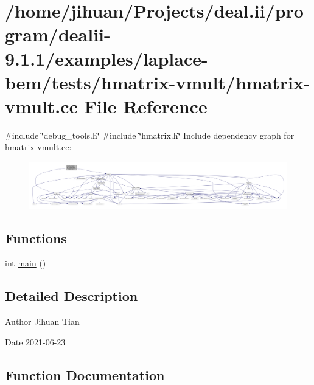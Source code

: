 \hypertarget{hmatrix-vmult_8cc}{}\section{/home/jihuan/\+Projects/deal.ii/program/dealii-\/9.1.1/examples/laplace-\/bem/tests/hmatrix-\/vmult/hmatrix-\/vmult.cc File Reference}
\label{hmatrix-vmult_8cc}
{\ttfamily \#include \char`\"{}debug\+\_\+tools.\+h\char`\"{}}\newline
{\ttfamily \#include \char`\"{}hmatrix.\+h\char`\"{}}\newline
Include dependency graph for hmatrix-\/vmult.cc\+:
\nopagebreak
\begin{figure}[H]
\begin{center}
\leavevmode
\includegraphics[width=350pt]{hmatrix-vmult_8cc__incl}
\end{center}
\end{figure}
\subsection*{Functions}
\begin{DoxyCompactItemize}
\item 
int \hyperlink{hmatrix-vmult_8cc_ae66f6b31b5ad750f1fe042a706a4e3d4}{main} ()
\end{DoxyCompactItemize}


\subsection{Detailed Description}
\begin{DoxyAuthor}{Author}
Jihuan Tian 
\end{DoxyAuthor}
\begin{DoxyDate}{Date}
2021-\/06-\/23 
\end{DoxyDate}


\subsection{Function Documentation}
\mbox{\label{hmatrix-vmult_8cc_ae66f6b31b5ad750f1fe042a706a4e3d4}} 
